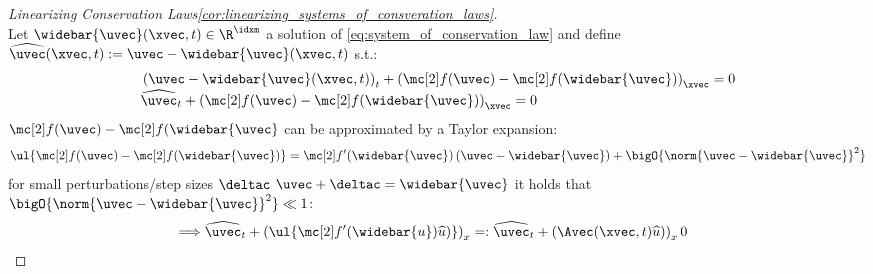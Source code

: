 \begin{proofbox}\nospacing
    \begin{proof}[Linearizing Conservation Laws\cref{cor:linearizing_systems_of_consveration_laws}]\label{proof:cor:linearizing_systems_of_consveration_laws}\leavevmode\\
        Let $\widebar{\uvec}(\xvec,t)\in\R^{\idxm}$ a solution of \cref{eq:system_of_conservation_law} and define $\widehat{\uvec}(\xvec,t):=\uvec-\widebar{\uvec}(\xvec,t)$ s.t.:
        \begin{align*}
          &\left(\uvec-\widebar{\uvec}(\xvec,t)\right)_{t}+\left(\flux(\uvec)-\flux(\widebar{\uvec})\right)_{\xvec}=0 \\[-1\jot]
          &\widehat{\uvec}_{t}+\left(\flux(\uvec)-\flux(\widebar{\uvec})\right)_{\xvec}=0
        \end{align*}
        $\flux(\uvec)-\flux(\widebar{\uvec}$ can be approximated by a Taylor expansion:
        \begin{align*}
          \ul{\flux(\uvec)-\flux(\widebar{\uvec})}=\flux'(\widebar{\uvec})\left(\uvec-\widebar{\uvec}\right)+\bigO{\norm{\uvec-\widebar{\uvec}}^{2}}
        \end{align*}
        for small perturbations/step sizes $\deltac$ $\uvec+\deltac=\widebar{\uvec}$ it holds that $\bigO{\norm{\uvec-\widebar{\uvec}}^{2}}\ll1$:
        \begin{align*}
          \implies&\widehat{\uvec}_{t}+\left(\ul{\flux'(\widebar{u})\widehat{u})}\right)_{x}=:\widehat{\uvec}_{t}+\left(\Avec(\xvec,t)\widehat{u})\right)_{x}0
        \end{align*}
    \end{proof}
\end{proofbox}
